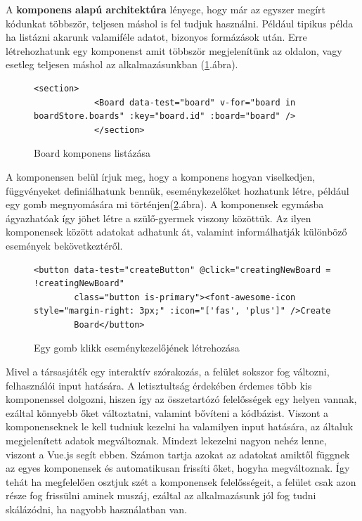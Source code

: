 \documentclass[a4paper,twoside]{article}
\begin{document}
 A \textbf{komponens alapú architektúra} lényege, hogy már az egyszer megírt kódunkat többször, teljesen máshol is fel tudjuk használni. Például tipikus példa 
ha listázni akarunk valamiféle adatot, bizonyos formázások után. Erre létrehozhatunk egy komponenst amit többször megjelenítünk az oldalon, vagy esetleg teljesen máshol az alkalmazásunkban (\ref{komponens}.ábra).
\begin{figure}
	\caption{Board komponens listázása}
	\begin{minipage}{\textwidth}
		\begin{lstlisting}[style=javascriptStyle]
			<section>
			<Board data-test="board" v-for="board in boardStore.boards" :key="board.id" :board="board" />
			</section>
		\end{lstlisting}
	\end{minipage}
	\label{komponens}
\end{figure}
\FloatBarrier
A komponensen belül írjuk meg, hogy a komponens hogyan viselkedjen, függvényeket definiálhatunk bennük, eseménykezelőket hozhatunk létre, például egy gomb megnyomására mi történjen(\ref{button-click}.ábra). A komponensek egymásba ágyazhatóak így jöhet létre a szülő-gyermek viszony közöttük. Az ilyen komponensek között adatokat adhatunk át, valamint informálhatják különböző események bekövetkeztéről. 
\begin{figure}
	\caption{Egy gomb klikk eseménykezelőjének létrehozása}
	\begin{minipage}{\textwidth}
		\begin{lstlisting}[style=javascriptStyle]
		<button data-test="createButton" @click="creatingNewBoard = !creatingNewBoard"
		class="button is-primary"><font-awesome-icon style="margin-right: 3px;" :icon="['fas', 'plus']" />Create
		Board</button>
		\end{lstlisting}
	\end{minipage}
	\label{button-click}
\end{figure}

Mivel a társasjáték egy interaktív szórakozás, a felület sokszor fog változni, felhasználói input hatására. A letisztultság érdekében érdemes több kis komponenssel dolgozni, hiszen így az összetartózó felelősségek egy helyen vannak, ezáltal könnyebb őket változtatni, valamint bővíteni a kódbázist. Viszont a komponenseknek le kell tudniuk kezelni ha valamilyen input hatására, az általuk megjelenített adatok megváltoznak. Mindezt lekezelni nagyon nehéz lenne, viszont a Vue.js segít ebben. Számon tartja azokat az adatokat amiktől függnek az egyes komponensek és automatikusan frissíti őket, hogyha megváltoznak. Így tehát ha megfelelően osztjuk szét a komponensek felelősségeit, a felület csak azon része fog frissülni aminek muszáj, ezáltal az alkalmazásunk jól fog tudni skálázódni, ha nagyobb használatban van. 
\end{document}
